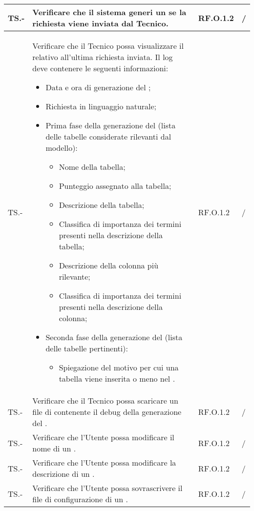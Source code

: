 \begin{adjustwidth}{-0.5cm}{-0.5cm}
\begin{longtable}{|P{1.5cm}|>{\raggedright}P{7cm}|P{2.5cm}|>{\arraybackslash}P{1.5cm}|}
		\hline TS.- & Verificare che il sistema generi un  se la richiesta viene inviata dal Tecnico. & RF.O.1.2 & / \\ 
		\hline TS.- & Verificare che il Tecnico possa visualizzare il  relativo all'ultima richiesta inviata. Il log deve contenere le seguenti informazioni:
    \begin{itemize}
      \item Data e ora di generazione del ;
      \item Richiesta in linguaggio naturale;
      \item Prima fase della generazione del  (lista delle tabelle considerate rilevanti dal modello):
      \begin{itemize}
        \item Nome della tabella;
        \item Punteggio assegnato alla tabella;
        \item Descrizione della tabella;
        \item Classifica di importanza dei termini presenti nella descrizione della tabella;
        \item Descrizione della colonna più rilevante;
        \item Classifica di importanza dei termini presenti nella descrizione della colonna;
      \end{itemize}
      \item Seconda fase della generazione del  (lista delle tabelle pertinenti):
      \begin{itemize}
        \item Spiegazione del motivo per cui una tabella viene inserita o meno nel .
      \end{itemize}
    \end{itemize}
		& RF.O.1.2 & / \\ 
		\hline TS.- & Verificare che il Tecnico possa scaricare un file di  contenente il debug della generazione del . & RF.O.1.2 & / \\ 
		\hline TS.- & Verificare che l'Utente possa modificare il nome di un . & RF.O.1.2 & / \\ 
		\hline TS.- & Verificare che l'Utente possa modificare la descrizione di un . & RF.O.1.2 & / \\
		\hline TS.- & Verificare che l'Utente possa sovrascrivere il file di configurazione di un . & RF.O.1.2 & / \\

\end{longtable}
\end{adjustwidth}
